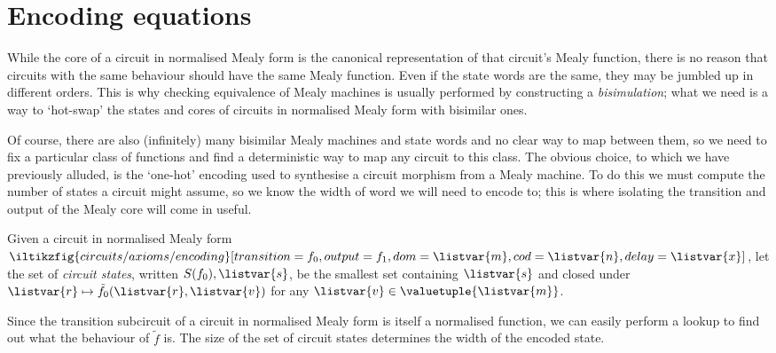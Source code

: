 \section{Encoding equations}

While the core of a circuit in normalised Mealy form is the canonical
representation of that circuit's Mealy function, there is no reason that
circuits with the same behaviour should have the same Mealy function.
Even if the state words are the same, they may be jumbled up in different
orders.
This is why checking equivalence of Mealy machines is usually performed by
constructing a \emph{bisimulation}; what we need is a way to `hot-swap' the
states and cores of circuits in normalised Mealy form with bisimilar ones.

Of course, there are also (infinitely) many bisimilar Mealy machines and state
words and no clear way to map between them, so we need to fix a particular
class of functions and find a deterministic way to map any circuit to this
class.
The obvious choice, to which we have previously alluded, is the `one-hot'
encoding used to synthesise a circuit morphism from a Mealy machine.
To do this we must compute the number of states a circuit might assume, so we
know the width of word we will need to encode to; this is where isolating the
transition and output of the Mealy core will come in useful.

\begin{definition}
    Given a circuit in normalised Mealy form \(
        \iltikzfig{circuits/axioms/encoding}[transition={f_0},output={f_1},dom=\listvar{m},cod=\listvar{n},delay=\listvar{x}]
    \), let the set of \emph{circuit states}, written \(S(f_0),\listvar{s}\),
    be the smallest set containing \(\listvar{s}\) and closed under \(
        \listvar{r} \mapsto \tilde{f}_0(\listvar{r},\listvar{v})
    \) for any \(\listvar{v} \in \valuetuple{\listvar{m}}\).
\end{definition}

Since the transition subcircuit of a circuit in normalised Mealy form is itself
a normalised function, we can easily perform a lookup to find out what the
behaviour of \(\tilde{f}\) is.
The size of the set of circuit states determines the width of the encoded state.

